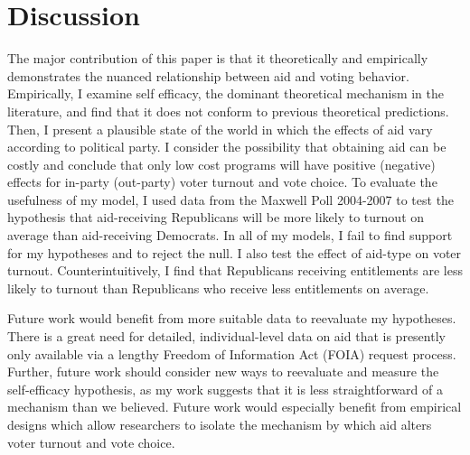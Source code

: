 \documentclass[12pt]{paper}
\begin{document}
\section{Discussion}
The major contribution of this paper is that it theoretically and empirically demonstrates the nuanced relationship between aid and voting behavior. Empirically, I examine self efficacy, the dominant theoretical mechanism in the literature, and find that it does not conform to previous theoretical predictions. Then, I present a plausible state of the world in which the effects of aid vary according to political party. I consider the possibility that obtaining aid can be costly and conclude that only low cost programs will have positive (negative) effects for in-party (out-party) voter turnout and vote choice. To evaluate the usefulness of my model, I used data from the Maxwell Poll 2004-2007 to test the hypothesis that aid-receiving Republicans will be more likely to turnout on average than aid-receiving Democrats. In all of my models, I fail to find support for my hypotheses and to reject the null. I also test the effect of aid-type on voter turnout. Counterintuitively, I find that Republicans receiving entitlements are less likely to turnout than Republicans who receive less entitlements on average.

Future work would benefit from more suitable data to reevaluate my hypotheses. There is a great need for detailed, individual-level data on aid that is presently only available via a lengthy Freedom of Information Act (FOIA) request process. Further, future work should consider new ways to reevaluate and measure the self-efficacy hypothesis, as my work suggests that it is less straightforward of a mechanism than we believed. Future work would especially benefit from empirical designs which allow researchers to isolate the mechanism by which aid alters voter turnout and vote choice.

%
%

\clearpage
\end{document}
